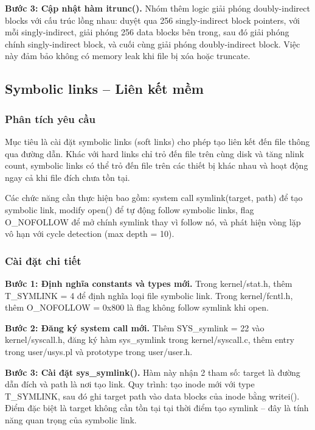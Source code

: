 \documentclass[12pt,a4paper]{article}
\begin{document}
\textbf{Bước 3: Cập nhật hàm itrunc().} Nhóm thêm logic giải phóng doubly-indirect blocks với cấu trúc lồng nhau: duyệt qua 256 singly-indirect block pointers, với mỗi singly-indirect, giải phóng 256 data blocks bên trong, sau đó giải phóng chính singly-indirect block, và cuối cùng giải phóng doubly-indirect block. Việc này đảm bảo không có memory leak khi file bị xóa hoặc truncate.

\subsection{Symbolic links -- Liên kết mềm}

\subsubsection{Phân tích yêu cầu}

Mục tiêu là cài đặt symbolic links (soft links) cho phép tạo liên kết đến file thông qua đường dẫn. Khác với hard links chỉ trỏ đến file trên cùng disk và tăng nlink count, symbolic links có thể trỏ đến file trên các thiết bị khác nhau và hoạt động ngay cả khi file đích chưa tồn tại.

Các chức năng cần thực hiện bao gồm: system call symlink(target, path) để tạo symbolic link, modify open() để tự động follow symbolic links, flag O\_NOFOLLOW để mở chính symlink thay vì follow nó, và phát hiện vòng lặp vô hạn với cycle detection (max depth = 10).

\subsubsection{Cài đặt chi tiết}

\textbf{Bước 1: Định nghĩa constants và types mới.} Trong kernel/stat.h, thêm T\_SYMLINK = 4 để định nghĩa loại file symbolic link. Trong kernel/fcntl.h, thêm O\_NOFOLLOW = 0x800 là flag không follow symlink khi open.

\textbf{Bước 2: Đăng ký system call mới.} Thêm SYS\_symlink = 22 vào kernel/syscall.h, đăng ký hàm sys\_symlink trong kernel/syscall.c, thêm entry trong user/usys.pl và prototype trong user/user.h.

\textbf{Bước 3: Cài đặt sys\_symlink().} Hàm này nhận 2 tham số: target là đường dẫn đích và path là nơi tạo link. Quy trình: tạo inode mới với type T\_SYMLINK, sau đó ghi target path vào data blocks của inode bằng writei(). Điểm đặc biệt là target không cần tồn tại tại thời điểm tạo symlink -- đây là tính năng quan trọng của symbolic link.
\end{document}
